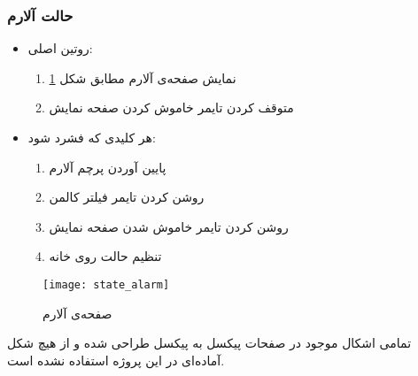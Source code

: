 \subsubsection{حالت آلارم}
\begin{itemize}
	\item روتین اصلی:
	\begin{enumerate}
		\item نمایش صفحه‌ی آلارم مطابق شکل \ref{fig:state-ringing}
		\item متوقف کردن تایمر خاموش کردن صفحه نمایش
	\end{enumerate}
	\item هر کلیدی که فشرد شود:
	\begin{enumerate}
		\item پایین آوردن پرچم آلارم
		\item روشن کردن تایمر فیلتر کالمن
		\item روشن کردن تایمر خاموش شدن صفحه نمایش
		\item تنظیم حالت روی خانه
	\end{enumerate}
\end{itemize}
	\begin{figure}[h]
		\centering
		\texttt{[image: state\_alarm]}
		\caption{صفحه‌ی آلارم}
		\label{fig:state-ringing}
	\end{figure}

تمامی اشکال موجود در صفحات پیکسل به پیکسل طراحی شده و از هیچ شکل آماده‌ای در این پروژه استفاده نشده است.
\newpage
